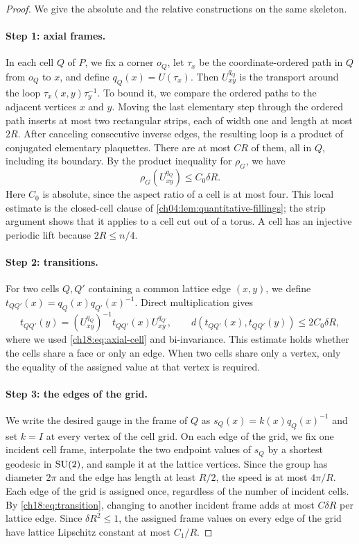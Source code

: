 \begin{proof}
We give the absolute and the relative constructions on the same skeleton.

\paragraph{Step 1: axial frames.}
In each cell $Q$ of $P$, we fix a corner $o_Q$, let $\tau_x$ be the coordinate-ordered path in $Q$ from $o_Q$ to $x$, and define $q_Q(x)=U(\tau_x)$. Then $U^{q_Q}_{xy}$ is the transport around the loop $\tau_x(x,y)\tau_y^{-1}$. To bound it, we compare the ordered paths to the adjacent vertices $x$ and $y$. Moving the last elementary step through the ordered path inserts at most two rectangular strips, each of width one and length at most $2R$. After canceling consecutive inverse edges, the resulting loop is a product of conjugated elementary plaquettes. There are at most $CR$ of them, all in $Q$, including its boundary. By the product inequality for $\rho_G$, we have
\begin{equation}\label{ch18:eq:axial-cell}
 \rho_G(U_{xy}^{q_Q})\le C_0\delta R.
\end{equation}
Here $C_0$ is absolute, since the aspect ratio of a cell is at most four. This local estimate is the closed-cell clause of \cref{ch04:lem:quantitative-fillings}; the strip argument shows that it applies to a cell cut out of a torus. A cell has an injective periodic lift because $2R\le n/4$.

\paragraph{Step 2: transitions.}
For two cells $Q,Q'$ containing a common lattice edge $(x,y)$, we define $t_{QQ'}(x)=q_Q(x)q_{Q'}(x)^{-1}$. Direct multiplication gives
\begin{equation}\label{ch18:eq:transition}
 t_{QQ'}(y)=(U_{xy}^{q_Q})^{-1}t_{QQ'}(x)U_{xy}^{q_{Q'}},
 \qquad
 d(t_{QQ'}(x),t_{QQ'}(y))\le2C_0\delta R,
\end{equation}
where we used \eqref{ch18:eq:axial-cell} and bi-invariance. This estimate holds whether the cells share a face or only an edge. When two cells share only a vertex, only the equality of the assigned value at that vertex is required.

\paragraph{Step 3: the edges of the grid.}
We write the desired gauge in the frame of $Q$ as $s_Q(x)=k(x)q_Q(x)^{-1}$ and set $k=I$ at every vertex of the cell grid. On each edge of the grid, we fix one incident cell frame, interpolate the two endpoint values of $s_Q$ by a shortest geodesic in $\mathrm{SU}(2)$, and sample it at the lattice vertices. Since the group has diameter $2\pi$ and the edge has length at least $R/2$, the speed is at most $4\pi/R$. Each edge of the grid is assigned once, regardless of the number of incident cells. By \eqref{ch18:eq:transition}, changing to another incident frame adds at most $C\delta R$ per lattice edge. Since $\delta R^2\le1$, the assigned frame values on every edge of the grid have lattice Lipschitz constant at most $C_1/R$.


\end{proof}
